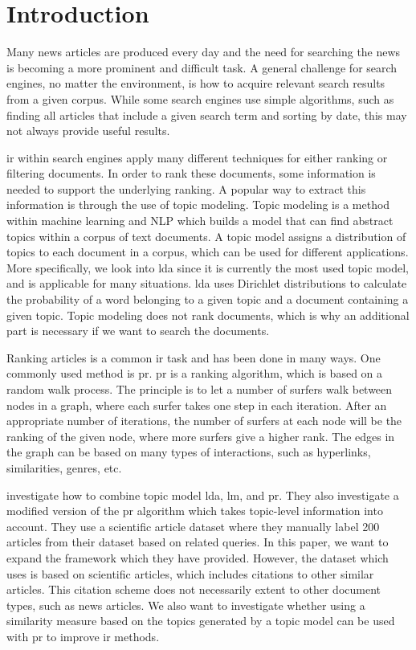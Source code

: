 \section{Introduction}\label{sec:intro}


Many news articles are produced every day and the need for searching the news is becoming a more prominent and difficult task.
A general challenge for search engines, no matter the environment, is how to acquire relevant search results from a given corpus. 
While some search engines use simple algorithms, such as finding all articles that include a given search term and sorting by date, this may not always provide useful results.

\gls{ir} within search engines apply many different techniques for either ranking or filtering documents\cite{google_pagerank2006}.
In order to rank these documents, some information is needed to support the underlying ranking.
A popular way to extract this information is through the use of topic modeling.
Topic modeling is a method within machine learning and \gls{NLP} which builds a model that can find abstract topics within a corpus of text documents.
A topic model assigns a distribution of topics to each document in a corpus, which can be used for different applications.
More specifically, we look into \gls{lda} since it is currently the most used topic model, and is applicable for many situations\cite{lda}.
\gls{lda} uses Dirichlet distributions to calculate the probability of a word belonging to a given topic and a document containing a given topic.
Topic modeling does not rank documents, which is why an additional part is necessary if we want to search the documents.

Ranking articles is a common \gls{ir} task and has been done in many ways.
One commonly used method is \gls{pr}\cite{google_pagerank2006}\cite{pagerank_1999}.
\gls{pr} is a ranking algorithm, which is based on a random walk process.
The principle is to let a number of surfers walk between nodes in a graph, where each surfer takes one step in each iteration.
After an appropriate number of iterations, the number of surfers at each node will be the ranking of the given node, where more surfers give a higher rank.
The edges in the graph can be based on many types of interactions, such as hyperlinks, similarities, genres, etc.

\citet{yang2009topic} investigate how to combine topic model \gls{lda}, \gls{lm}, and \gls{pr}.
They also investigate a modified version of the \gls{pr} algorithm which takes topic-level information into account.
They use a scientific article dataset where they manually label 200 articles from their dataset based on related queries. 
In this paper, we want to expand the framework which they have provided.
However, the dataset which \cite{yang2009topic} uses is based on scientific articles, which includes citations to other similar articles.
This citation scheme does not necessarily extent to other document types, such as news articles.
We also want to investigate whether using a similarity measure based on the topics generated by a topic model can be used with \gls{pr} to improve \gls{ir} methods.

